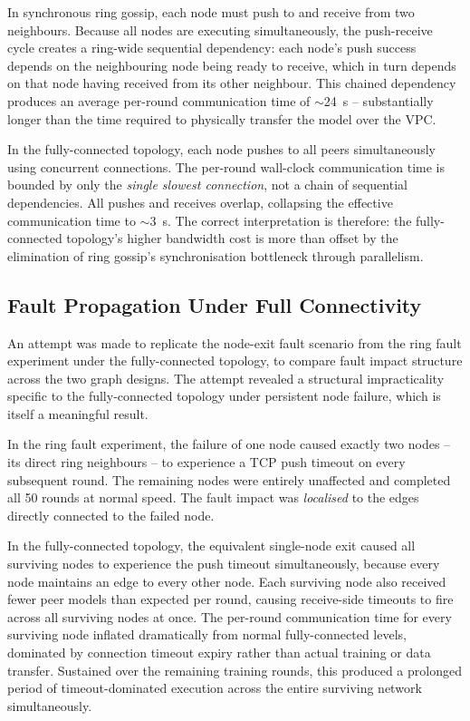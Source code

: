 \documentclass[12pt]{report}
\begin{document}
In synchronous ring gossip, each node must push to and receive from two
neighbours. Because all nodes are executing simultaneously, the push-receive
cycle creates a ring-wide sequential dependency: each node's push success
depends on the neighbouring node being ready to receive, which in turn
depends on that node having received from its other neighbour. This chained
dependency produces an average per-round communication time of $\sim$24~s --
substantially longer than the time required to physically transfer
the model over the VPC.

In the fully-connected topology, each node pushes to all peers simultaneously
using concurrent connections. The per-round wall-clock communication time is
bounded by only the \emph{single slowest connection}, not a chain of sequential
dependencies. All pushes and receives overlap, collapsing the effective
communication time to $\sim$3~s. The correct interpretation is therefore: the
fully-connected topology's higher bandwidth cost is more than offset by the
elimination of ring gossip's synchronisation bottleneck through parallelism.

\subsection{Fault Propagation Under Full Connectivity}
\label{sec:fc-fault}

An attempt was made to replicate the node-exit fault scenario from the ring
fault experiment under the fully-connected topology, to compare fault impact
structure across the two graph designs. The attempt revealed a structural
impracticality specific to the fully-connected topology under persistent node
failure, which is itself a meaningful result.

In the ring fault experiment, the failure of one node caused exactly two nodes
-- its direct ring neighbours -- to experience a TCP push timeout on every
subsequent round. The remaining nodes were entirely unaffected and completed
all 50 rounds at normal speed. The fault impact was \emph{localised} to the
edges directly connected to the failed node.

In the fully-connected topology, the equivalent single-node exit caused all
surviving nodes to experience the push timeout simultaneously, because every
node maintains an edge to every other node. Each surviving node also received
fewer peer models than expected per round, causing receive-side timeouts to
fire across all surviving nodes at once. The per-round communication time
for every surviving node inflated dramatically from normal fully-connected
levels, dominated by connection timeout expiry rather than actual training
or data transfer. Sustained over the remaining training rounds, this produced
a prolonged period of timeout-dominated execution across the entire surviving
network simultaneously.
\end{document}
